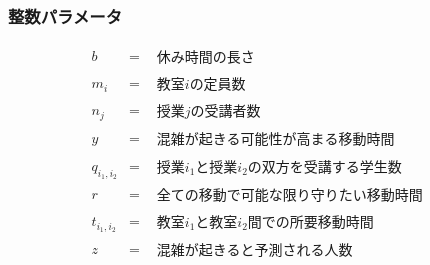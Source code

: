 \documentclass[dvipdfmx,12pt]{beamer}
\begin{document}
\begin{frame}
\frametitle {\Large 整数パラメータ}
\[
\begin{array}{rcl}

b & = &
\begin{array}{ll}
\mbox{休み時間の長さ} 
\end{array}
\\




m_{i} & = & 
\begin{array}{ll}
 \mbox{教室$i$の定員数} 
\end{array}
\\


n_{j} & = & 
\begin{array}{ll}
 \mbox{授業$j$の受講者数} 
\end{array}
\\




y & = & 
\begin{array}{ll}
 \mbox{混雑が起きる可能性が高まる移動時間} 
\end{array}
\\


q_{i_1,i_2} & = & 
\begin{array}{ll}
 \mbox{授業$i_1$と授業$i_2$の双方を受講する学生数} 
\end{array}
\\


r & = & 
\begin{array}{ll}
 \mbox{全ての移動で可能な限り守りたい移動時間} 
\end{array}
\\


t_{i_1,i_2} & = & 
\begin{array}{ll}
 \mbox{教室$i_1$と教室$i_2$間での所要移動時間} 
\end{array}
\\


z & = & 
\begin{array}{ll}
 \mbox{混雑が起きると予測される人数} 
\end{array}
\\
\end{array}
\]
\end{frame}
\end{document}
